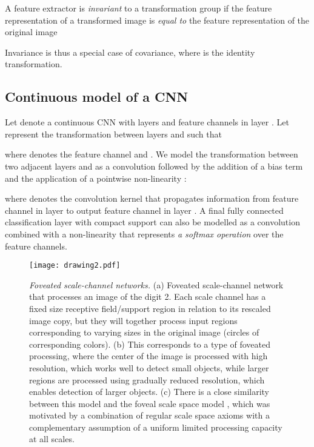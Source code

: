 \documentclass[twocolumn,runningheads]{svjour3}
\begin{document}
A feature extractor  is {\em invariant\/} to a transformation group  if the feature representation of a transformed image is \emph{equal to} the feature representation of the original image 
 
Invariance is thus a special case of covariance, where  is the identity transformation. 

\subsection{Continuous model of a CNN}

Let  denote a continuous CNN with  layers and  feature channels in layer .
Let  represent the transformation between layers  and  such that
 
where  denotes the feature channel and .
We model the transformation  between two adjacent layers
 and  as a convolution followed by the
addition of a bias term  and the application of a
pointwise non-linearity :

where 
denotes the convolution kernel that propagates information from
feature 
channel  in layer  to output feature channel  in layer .
A final fully connected classification layer with compact support can
also be modelled as a convolution combined with a non-linearity
 that represents {\em a softmax operation\/} over the
feature channels.

\begin{figure*}[hbpt]
	\begin{center}
		\texttt{[image: drawing2.pdf]} 
	\end{center}
	\caption{\emph{Foveated scale-channel networks.} (a) 
		Foveated scale-channel network that processes an image
                of the digit 2. Each scale channel has a fixed
                size receptive field/support region in relation to its rescaled image copy, but they will together process input regions
                corresponding to varying sizes in the original image
                (circles of corresponding colors).
		(b) This corresponds to a type of foveated processing,
                where the center of the image is processed with high
                resolution, which works well to detect small objects,
                while larger regions are processed using gradually
                reduced resolution, which enables detection of larger
                objects. (c) There is a close similarity between this
                model and the foveal scale space model \cite{CVAP166},
                which was motivated by a combination of regular scale
                space axioms with a complementary assumption of a
                uniform limited processing capacity at all scales.}
	\label{fig-foveated-processing}
\end{figure*}
\end{document}
